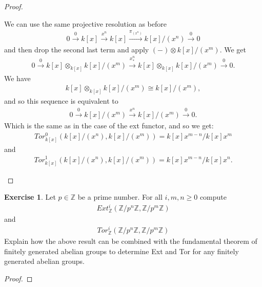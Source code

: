 \documentclass[12pt]{extarticle}
\newcommand{\Z}{\mathbb{Z}}
\newcommand{\<}{\langle}
\renewcommand{\>}{\rangle}
\theoremstyle{definition}
\newtheorem{exercise}{Exercise}
\begin{document}
\begin{proof}
\begin{itemize}
    We can use the same projective resolution as before
    \begin{align*}
      0 \xrightarrow{0} k[x] \xrightarrow{x^n} k[x] \xrightarrow{\pi_{(x^n)}} k[x]/(x^n) \xrightarrow{0} 0  
    \end{align*}
    and then drop the second last term and apply $(-) \otimes k[x]/(x^m)$.
    We get
    \begin{align*}
      0 \xrightarrow{0} k[x] \otimes_{k[x]} k[x]/(x^m)  \xrightarrow{x^n_*} k[x] \otimes_{k[x]} k[x]/(x^m) \xrightarrow{0} 0  .
    \end{align*}
    We have
    \begin{align*}
      k[x] \otimes_{k[x]} k[x]/(x^m) \cong k[x]/(x^m),
    \end{align*}
    and so this sequence is equivalent to
    \begin{align*}
      0 \xrightarrow{0} k[x]/(x^m)  \xrightarrow{x^n} k[x]/(x^m) \xrightarrow{0} 0  .      
    \end{align*}
    Which is the same as in the case of the ext functor, and so we get:
    \begin{align*}
      Tor_{k[x]}^0(k[x]/(x^n), k[x]/(x^m)) = k[x]x^{m-n}/k[x]x^m 
    \end{align*}
    and
    \begin{align*}
      Tor_{k[x]}^1(k[x]/(x^n), k[x]/(x^m)) = k[x]x^{m-n}/k[x]x^n .
    \end{align*}
  \end{itemize}
\end{proof}
\begin{exercise}
  Let $p \in \Z$ be a prime number. For all $i,m,n \geq 0 $ compute
  \begin{align*}
    Ext_{\Z}^i(\Z/p^n\Z, \Z/p^m\Z)
  \end{align*}
  and
  \begin{align*}
    Tor_{\Z}^i(\Z/p^n\Z, \Z/p^m\Z)
  \end{align*}
  Explain how the above result can be combined with the fundamental theorem of finitely generated abelian groups to determine Ext and Tor for any finitely generated abelian groups.
\end{exercise}
\begin{proof}
  
\end{proof}
\end{document}
